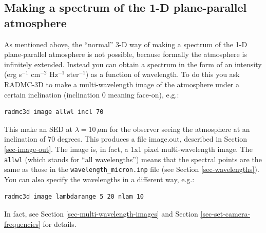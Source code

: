 \documentclass{report}
\newenvironment{asciibox}%
  {\begin{list}{}{%
    \setlength{\topsep}{0.5em}%
    \setlength{\parskip}{0em}%
    \setlength{\parsep}{0em}%
    \setlength{\itemsep}{0em}%
    \setlength{\rightmargin}{0em}%
    \setlength{\leftmargin}{3.0em}%
    \setlength{\labelsep}{1em}%
    \setlength{\labelwidth}{2em}%
  }\normalfont\footnotesize\item}
  {\end{list}}
\begin{document}
\subsection{Making a spectrum of the 1-D plane-parallel atmosphere}
As mentioned above, the ``normal'' 3-D way of making a spectrum of the 1-D
plane-parallel atmosphere is not possible, because formally the atmosphere
is infinitely extended. Instead you can obtain a spectrum in the form of an
intensity (erg s$^{-1}$ cm$^{-2}$ Hz$^{-1}$ ster$^{-1}$) as a function of
wavelength. To do this you ask RADMC-3D to make a multi-wavelength image of
the atmosphere under a certain inclination (inclination 0 meaning face-on),
e.g.:
\begin{asciibox}\begin{verbatim}
radmc3d image allwl incl 70
\end{verbatim}\end{asciibox}
This make an SED at $\lambda=10\,\mu$m for the observer seeing the
atmosphere at an inclination of 70 degrees. This produces a file image.out,
described in Section \ref{sec-image-out}. The image is, in fact, a 1x1 pixel
multi-wavelength image. The {\small\tt allwl} (which stands for ``all
wavelengths'') means that the spectral points are the same as those in the
{\small\tt wavelength\_micron.inp} file (see Section \ref{sec-wavelengths}).
You can also specify the wavelengths in a different way, e.g.:
\begin{asciibox}\begin{verbatim}
radmc3d image lambdarange 5 20 nlam 10
\end{verbatim}\end{asciibox}
In fact, see Section \ref{sec-multi-wavelength-images} and
Section \ref{sec-set-camera-frequencies} for details.
\end{document}
